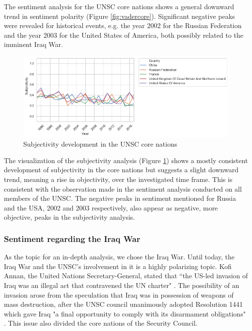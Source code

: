 The sentiment analysis for the UNSC core nations shows a general downward trend in sentiment polarity (Figure \ref{fig:vadercore}). Significant negative peaks were revealed for historical events, e.g. the year 2002 for the Russian Federation and the year 2003 for the United States of America, both possibly related to the imminent Iraq War.

\begin{figure}[b]
  \centering
  \includegraphics[width=14cm]{img/over_time_Blob_Subjectivityy.png}
  \caption{Subjectivity development in the UNSC core nations}
  \label{fig:subjcore}
\end{figure}%

The visualization of the subjectivity analysis (Figure  \ref{fig:subjcore}) shows a mostly consistent development of subjectivity in the core nations but suggests a slight downward trend, meaning a rise in objectivity, over the investigated time frame. This is consistent with the observation made in %
the sentiment analysis conducted on all members of the UNSC. The negative peaks in sentiment mentioned for Russia and the USA, 2002 and 2003 respectively, also appear as negative, more objective, peaks in the subjectivity analysis.

\subsubsection{Sentiment regarding the Iraq War}
As the topic for an in-depth analysis, we chose the Iraq War. Until today, the Iraq War and the UNSC's involvement in it is a highly polarizing topic. Kofi Annan, the United Nations Secretary-General, stated that ``the US-led invasion of Iraq was an illegal act that contravened the UN charter" \citep{bbciraq}.
The possibility of an invasion arose from the speculation that Iraq was in possession of weapons of mass destruction, after the UNSC council unanimously adopted Resolution 1441 which gave Iraq "a final opportunity to comply with its disarmament obligations" \citep{resolution1441}.
This issue also divided the core nations of the Security Council.

